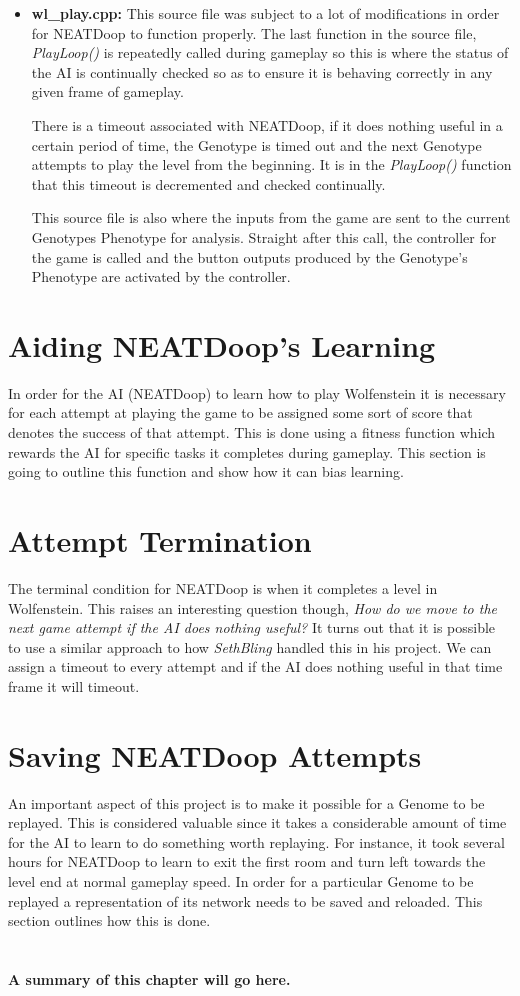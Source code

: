 \documentclass[]{Learning-to-Play-Wolfenstein-thesis}
\begin{document}
\begin{itemize}
\item\textbf{wl\_play.cpp:} This source file was subject to a lot of modifications in order for NEATDoop to function properly. The last function in the source file, \textit{PlayLoop()} is repeatedly called during gameplay so this is where the status of the AI is continually checked so as to ensure it is behaving correctly in any given frame of gameplay. 

There is a timeout associated with NEATDoop, if it does nothing useful in a certain period of time, the Genotype is timed out and the next Genotype attempts to play the level from the beginning. It is in the \textit{PlayLoop()} function that this timeout is decremented and checked continually. 

This source file is also where the inputs from the game are sent to the current Genotypes Phenotype for analysis. Straight after this call, the controller for the game is called and the button outputs produced by the Genotype's Phenotype are activated by the controller.
\end{itemize}
\section{Aiding NEATDoop's Learning}
In order for the AI (NEATDoop) to learn how to play Wolfenstein it is necessary for each attempt at playing the game to be assigned some sort of score that denotes the success of that attempt. This is done using a fitness function which rewards the AI for specific tasks it completes during gameplay. This section is going to outline this function and show how it can bias learning.

\section{Attempt Termination}
The terminal condition for NEATDoop is when it completes a level in Wolfenstein. This raises an interesting question though, \textit{How do we move to the next game attempt if the AI does nothing useful?} It turns out that it is possible to use a similar approach to how \textit{SethBling} handled this in his project. We can assign a timeout to every attempt and if the AI does nothing useful in that time frame it will timeout.

\section{Saving NEATDoop Attempts}
An important aspect of this project is to make it possible for a Genome to be replayed. This is considered valuable since it takes a considerable amount of time for the AI to learn to do something worth replaying. For instance, it took several hours for NEATDoop to learn to exit the first room and turn left towards the level end at normal gameplay speed. In order for a particular Genome to be replayed a representation of its network needs to be saved and reloaded. This section outlines how this is done.\\\\\\\textbf{A summary of this chapter will go here.}
\end{document}

